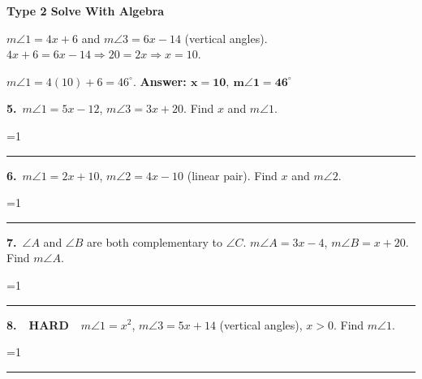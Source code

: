 \documentclass[11pt,letterpaper]{article}
\newcommand{\leveltag}[2]{\colorbox{#1}{\color{white}\bfseries\scriptsize\ #2\ }}
\newcommand{\LH}{\leveltag{fmmistake}{HARD}}
\newcommand{\topicbar}[1]{\needspace{4.5cm}\par\vspace{5mm}
  \begin{tcolorbox}[enhanced,colback=fmtitle,colframe=fmtitle,arc=2mm,left=4mm,top=1.5mm,bottom=1.5mm]
  \color{white}\bfseries\large #1
  \end{tcolorbox}}
\providecommand{\iskey}{0}
\newcommand{\pans}[2][3.2cm]{\ifnum\iskey=1 \underline{\makebox[#1][c]{\color{fmmistake}\bfseries #2}}\else\rule{#1}{0.4pt}\fi}
\newcommand{\algp}[3]{\begin{minipage}[t][4.6cm]{0.48\linewidth}{\color{fmturn}\bfseries #1.}\ #2\par\vfill\hfill \pans[4.2cm]{#3}\end{minipage}}
\newlength{\pw}
\renewcommand{\pans}[2][3.2cm]{\ifnum\iskey=1 \settowidth{\pw}{\bfseries #2}\ifdim\pw>#1 \parbox[b]{#1}{\raggedleft\color{fmmistake}\bfseries\small #2}\else\underline{\makebox[#1][c]{\color{fmmistake}\bfseries #2}}\fi\else\rule{#1}{0.4pt}\fi}
\begin{document}
\needspace{6cm}\topicbar{Type 2 \quad Solve With Algebra}
\begin{watchme}$m\angle 1 = 4x + 6$ and $m\angle 3 = 6x - 14$ (vertical angles). \ $4x + 6 = 6x - 14 \Rightarrow 20 = 2x \Rightarrow x = 10$.\par
$m\angle 1 = 4(10) + 6 = 46^\circ$. \quad \textbf{Answer: $\boldsymbol{x = 10,\ m\angle 1 = 46^\circ}$}\end{watchme}
\needspace{4.6cm}\noindent\algp{5}{$m\angle 1 = 5x - 12$, $m\angle 3 = 3x + 20$. Find $x$ and $m\angle 1$.}{$x = 16$, $m\angle 1 = 68^\circ$}\hfill\algp{6}{$m\angle 1 = 2x + 10$, $m\angle 2 = 4x - 10$ (linear pair). Find $x$ and $m\angle 2$.}{$x = 30$, $m\angle 2 = 110^\circ$}\par\vspace{2mm}
\needspace{4.6cm}\noindent\algp{7}{$\angle A$ and $\angle B$ are both complementary to $\angle C$. $m\angle A = 3x - 4$, $m\angle B = x + 20$. Find $m\angle A$.}{$x = 12$, $m\angle A = 32^\circ$}\hfill\algp{8}{\LH\ $m\angle 1 = x^2$, $m\angle 3 = 5x + 14$ (vertical angles), $x > 0$. Find $m\angle 1$.}{$x = 7$, $m\angle 1 = 49^\circ$}\par
\end{document}

